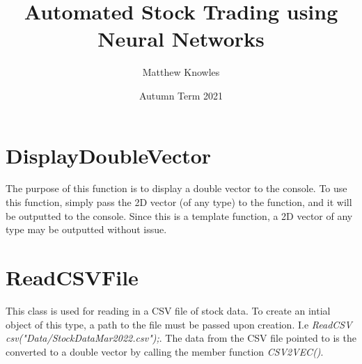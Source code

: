 \documentclass[11pt]{amsart}
\title{Automated Stock Trading using Neural Networks}
\author{Matthew Knowles}
\date{Autumn Term 2021}
\begin{document}
\maketitle

\section{DisplayDoubleVector}
The purpose of this function is to display a double vector to the console. To use this function, simply pass the 2D vector (of any type)
to the function, and it will be outputted to the console. Since this is a template function, a 2D vector of any type may be outputted without 
issue. 

\section{ReadCSVFile}
This class is used for reading in a CSV file of stock data. To create an intial object of this type, a path to the file must be passed upon 
creation. I.e \textit{ReadCSV csv("Data/StockDataMar2022.csv");}. The data from the CSV file pointed to is the converted to a double vector 
by calling the member function \textit{CSV2VEC()}. 
\end{document}
